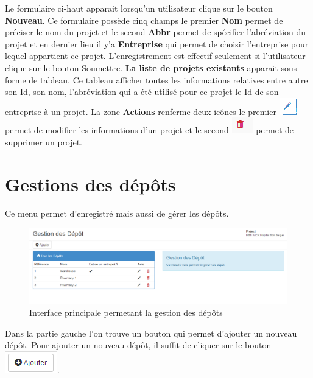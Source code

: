 \documentclass[12pt,a4paper]{report}
\begin{document}
Le formulaire ci-haut apparait lorsqu'un utilisateur clique sur le bouton \textbf{Nouveau}. Ce formulaire possède cinq champs le premier \textbf{Nom} permet de préciser le nom du projet et le second \textbf{Abbr} permet de spécifier l'abréviation du projet et en dernier lieu il y'a \textbf{Entreprise} qui permet de choisir l'entreprise pour lequel appartient ce projet.
L'enregistrement est effectif seulement si l'utilisateur clique sur le bouton Soumettre. \textbf{La liste de projets existants} apparait sous forme de tableau. Ce tableau afficher toutes les informations relatives entre autre son Id, son nom, l'abréviation qui a été utilisé pour ce projet le Id de son entreprise à un projet. La zone \textbf{Actions} renferme deux icônes le premier \includegraphics[scale=0.7]{pic/EditUser.png}  permet de modifier les informations d'un projet et le second \includegraphics[scale=0.7]{pic/DeleteWRed.png} permet de supprimer un projet.

\section{Gestions des dépôts}
Ce menu permet d'enregistré mais aussi de gérer les dépôts.

\begin{figure}[h]
\begin{center}
\includegraphics[width=14cm]{pic/GestionDesDepot.png}
\end{center}
\caption{Interface principale permetant la gestion des dépôts}
\label{Interface principale permetant la gestion des dépôts}
\end{figure}

Dans la partie gauche l'on trouve un bouton qui permet d'ajouter un nouveau dépôt. Pour ajouter un nouveau dépôt, il suffit de cliquer sur le bouton \includegraphics[scale=0.7]{pic/AddNewStore.png}.
\end{document}
